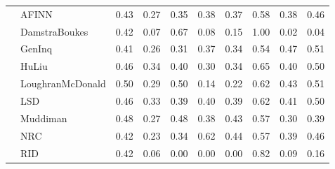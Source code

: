 \begin{tabularx}{\textwidth}{lXXrrrrrrrr}
 & \multicolumn{2}{l}{ AFINN }& \cellcolor[gray]{0.79} 0.43& \cellcolor[gray]{0.86} 0.27& \cellcolor[gray]{0.82} 0.35& \cellcolor[gray]{0.81} 0.38& \cellcolor[gray]{0.82} 0.37& \cellcolor[gray]{0.71} 0.58& \cellcolor[gray]{0.81} 0.38& \cellcolor[gray]{0.77} 0.46\\

 & \multicolumn{2}{l}{ DamstraBoukes }& \cellcolor[gray]{0.79} 0.42& \cellcolor[gray]{0.96} 0.07& \cellcolor[gray]{0.67} 0.67& \cellcolor[gray]{0.96} 0.08& \cellcolor[gray]{0.93} 0.15& \cellcolor[gray]{0.50} 1.00& \cellcolor[gray]{0.99} 0.02& \cellcolor[gray]{0.98} 0.04\\

 & \multicolumn{2}{l}{ GenInq }& \cellcolor[gray]{0.80} 0.41& \cellcolor[gray]{0.87} 0.26& \cellcolor[gray]{0.84} 0.31& \cellcolor[gray]{0.82} 0.37& \cellcolor[gray]{0.83} 0.34& \cellcolor[gray]{0.73} 0.54& \cellcolor[gray]{0.76} 0.47& \cellcolor[gray]{0.75} 0.51\\

 & \multicolumn{2}{l}{ HuLiu }& \cellcolor[gray]{0.77} 0.46& \cellcolor[gray]{0.83} 0.34& \cellcolor[gray]{0.80} 0.40& \cellcolor[gray]{0.85} 0.30& \cellcolor[gray]{0.83} 0.34& \cellcolor[gray]{0.68} 0.65& \cellcolor[gray]{0.80} 0.40& \cellcolor[gray]{0.75} 0.50\\

 & \multicolumn{2}{l}{ LoughranMcDonald }& \cellcolor[gray]{0.75} 0.50& \cellcolor[gray]{0.85} 0.29& \cellcolor[gray]{0.75} 0.50& \cellcolor[gray]{0.93} 0.14& \cellcolor[gray]{0.89} 0.22& \cellcolor[gray]{0.69} 0.62& \cellcolor[gray]{0.78} 0.43& \cellcolor[gray]{0.74} 0.51\\

 & \multicolumn{2}{l}{ LSD }& \cellcolor[gray]{0.77} 0.46& \cellcolor[gray]{0.84} 0.33& \cellcolor[gray]{0.80} 0.39& \cellcolor[gray]{0.80} 0.40& \cellcolor[gray]{0.80} 0.39& \cellcolor[gray]{0.69} 0.62& \cellcolor[gray]{0.79} 0.41& \cellcolor[gray]{0.75} 0.50\\

 & \multicolumn{2}{l}{ Muddiman }& \cellcolor[gray]{0.76} 0.48& \cellcolor[gray]{0.87} 0.27& \cellcolor[gray]{0.76} 0.48& \cellcolor[gray]{0.81} 0.38& \cellcolor[gray]{0.79} 0.43& \cellcolor[gray]{0.72} 0.57& \cellcolor[gray]{0.85} 0.30& \cellcolor[gray]{0.80} 0.39\\

 & \multicolumn{2}{l}{ NRC }& \cellcolor[gray]{0.79} 0.42& \cellcolor[gray]{0.89} 0.23& \cellcolor[gray]{0.83} 0.34& \cellcolor[gray]{0.69} 0.62& \cellcolor[gray]{0.78} 0.44& \cellcolor[gray]{0.72} 0.57& \cellcolor[gray]{0.80} 0.39& \cellcolor[gray]{0.77} 0.46\\

 & \multicolumn{2}{l}{ RID }& \cellcolor[gray]{0.79} 0.42& \cellcolor[gray]{0.97} 0.06& \cellcolor[gray]{1.00} 0.00& \cellcolor[gray]{1.00} 0.00& \cellcolor[gray]{1.00} 0.00& \cellcolor[gray]{0.59} 0.82& \cellcolor[gray]{0.95} 0.09& \cellcolor[gray]{0.92} 0.16\\


\bottomrule
\end{tabularx}

